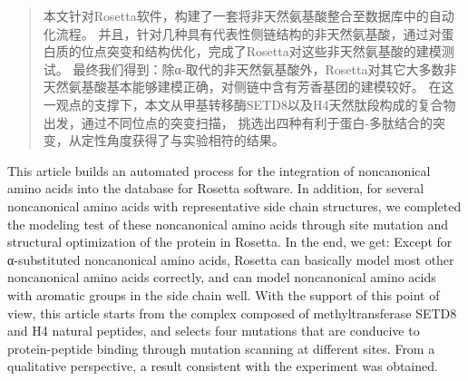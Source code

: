 

\begin{abstract}
  本文针对Rosetta软件，构建了一套将非天然氨基酸整合至数据库中的自动化流程。
  并且，针对几种具有代表性侧链结构的非天然氨基酸，通过对蛋白质的位点突变和结构优化，完成了Rosetta对这些非天然氨基酸的建模测试。
  最终我们得到：除α-取代的非天然氨基酸外，Rosetta对其它大多数非天然氨基酸基本能够建模正确，对侧链中含有芳香基团的建模较好。
  在这一观点的支撑下，本文从甲基转移酶SETD8以及H4天然肽段构成的复合物出发，通过不同位点的突变扫描，
  挑选出四种有利于蛋白-多肽结合的突变，从定性角度获得了与实验相符的结果。

\end{abstract}

\begin{abstract*}
  This article builds an automated process for the integration of noncanonical amino acids into the database for Rosetta software.
  In addition, for several noncanonical amino acids with representative side chain structures, we completed the modeling test of these noncanonical amino acids through site mutation and structural optimization of the protein in Rosetta.
  In the end, we get: Except for α-substituted noncanonical amino acids, Rosetta can basically model most other noncanonical amino acids correctly, and can model noncanonical amino acids with aromatic groups in the side chain well.
  With the support of this point of view, this article starts from the complex composed of methyltransferase SETD8 and H4 natural peptides, and selects four mutations that are conducive to protein-peptide binding through mutation scanning at different sites.
  From a qualitative perspective, a result consistent with the experiment was obtained.

\end{abstract*}
